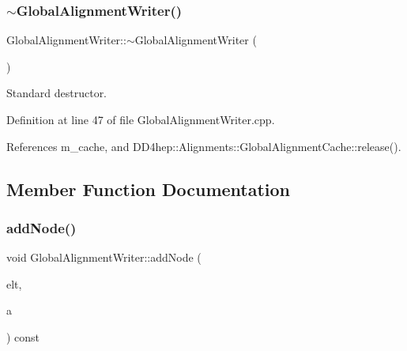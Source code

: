 \hypertarget{class_d_d4hep_1_1_alignments_1_1_global_alignment_writer_ac88d52ba1f9f66cd93b65b9464c9fd92}{}\label{class_d_d4hep_1_1_alignments_1_1_global_alignment_writer_ac88d52ba1f9f66cd93b65b9464c9fd92} 
\subsubsection{\texorpdfstring{$\sim$\+Global\+Alignment\+Writer()}{~GlobalAlignmentWriter()}}
{\footnotesize\ttfamily Global\+Alignment\+Writer\+::$\sim$\+Global\+Alignment\+Writer (\begin{DoxyParamCaption}{ }\end{DoxyParamCaption})\hspace{0.3cm}{\ttfamily [virtual]}}



Standard destructor. 



Definition at line 47 of file Global\+Alignment\+Writer.\+cpp.



References m\+\_\+cache, and D\+D4hep\+::\+Alignments\+::\+Global\+Alignment\+Cache\+::release().



\subsection{Member Function Documentation}
\hypertarget{class_d_d4hep_1_1_alignments_1_1_global_alignment_writer_a0689a380ae43d7fcfc1a564569a65e9a}{}\label{class_d_d4hep_1_1_alignments_1_1_global_alignment_writer_a0689a380ae43d7fcfc1a564569a65e9a} 
\subsubsection{\texorpdfstring{add\+Node()}{addNode()}}
{\footnotesize\ttfamily void Global\+Alignment\+Writer\+::add\+Node (\begin{DoxyParamCaption}\item[{\hyperlink{class_d_d4hep_1_1_x_m_l_1_1_element}{X\+M\+L\+::\+Element}}]{elt,  }\item[{\hyperlink{class_d_d4hep_1_1_alignments_1_1_global_alignment}{Global\+Alignment}}]{a }\end{DoxyParamCaption}) const\hspace{0.3cm}{\ttfamily [protected]}}



